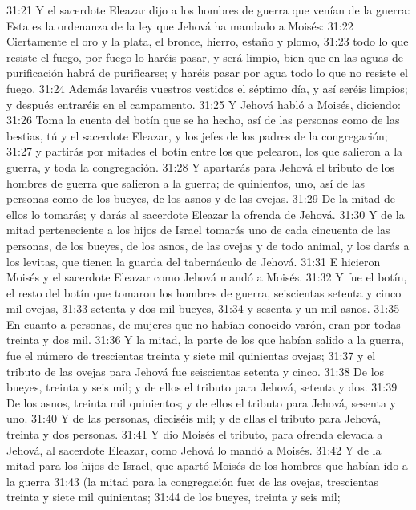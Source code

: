 31:21 Y el sacerdote Eleazar dijo a los hombres de guerra que venían de la guerra: Esta es la ordenanza de la ley que Jehová ha mandado a Moisés:  
31:22 Ciertamente el oro y la plata, el bronce, hierro, estaño y plomo, 
31:23 todo lo que resiste el fuego, por fuego lo haréis pasar, y será limpio, bien que en las aguas de purificación habrá de purificarse; y haréis pasar por agua todo lo que no resiste el fuego.  
31:24 Además lavaréis vuestros vestidos el séptimo día, y así seréis limpios; y después entraréis en el campamento.  
31:25 Y Jehová habló a Moisés, diciendo:  
31:26 Toma la cuenta del botín que se ha hecho, así de las personas como de las bestias, tú y el sacerdote Eleazar, y los jefes de los padres de la congregación;  
31:27 y partirás por mitades el botín entre los que pelearon, los que salieron a la guerra, y toda la congregación.  
31:28 Y apartarás para Jehová el tributo de los hombres de guerra que salieron a la guerra; de quinientos, uno, así de las personas como de los bueyes, de los asnos y de las ovejas.  
31:29 De la mitad de ellos lo tomarás; y darás al sacerdote Eleazar la ofrenda de Jehová.  
31:30 Y de la mitad perteneciente a los hijos de Israel tomarás uno de cada cincuenta de las personas, de los bueyes, de los asnos, de las ovejas y de todo animal, y los darás a los levitas, que tienen la guarda del tabernáculo de Jehová.  
31:31 E hicieron Moisés y el sacerdote Eleazar como Jehová mandó a Moisés.  
31:32 Y fue el botín, el resto del botín que tomaron los hombres de guerra, seiscientas setenta y cinco mil ovejas,  
31:33 setenta y dos mil bueyes,  
31:34 y sesenta y un mil asnos.  
31:35 En cuanto a personas, de mujeres que no habían conocido varón, eran por todas treinta y dos mil.  
31:36 Y la mitad, la parte de los que habían salido a la guerra, fue el número de trescientas treinta y siete mil quinientas ovejas;  
31:37 y el tributo de las ovejas para Jehová fue seiscientas setenta y cinco.  
31:38 De los bueyes, treinta y seis mil; y de ellos el tributo para Jehová, setenta y dos.  
31:39 De los asnos, treinta mil quinientos; y de ellos el tributo para Jehová, sesenta y uno. 
31:40 Y de las personas, dieciséis mil; y de ellas el tributo para Jehová, treinta y dos personas.  
31:41 Y dio Moisés el tributo, para ofrenda elevada a Jehová, al sacerdote Eleazar, como Jehová lo mandó a Moisés.  
31:42 Y de la mitad para los hijos de Israel, que apartó Moisés de los hombres que habían ido a la guerra  
31:43 (la mitad para la congregación fue: de las ovejas, trescientas treinta y siete mil quinientas;  
31:44 de los bueyes, treinta y seis mil;  
